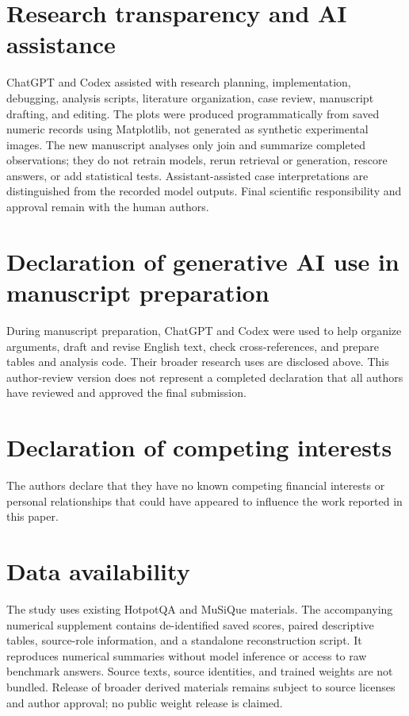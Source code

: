 \documentclass[preprint,12pt]{elsarticle}
\begin{document}
\section*{Research transparency and AI assistance}
ChatGPT and Codex assisted with research planning, implementation, debugging, analysis scripts, literature organization, case review, manuscript drafting, and editing. The plots were produced programmatically from saved numeric records using Matplotlib, not generated as synthetic experimental images. The new manuscript analyses only join and summarize completed observations; they do not retrain models, rerun retrieval or generation, rescore answers, or add statistical tests. Assistant-assisted case interpretations are distinguished from the recorded model outputs. Final scientific responsibility and approval remain with the human authors.

\section*{Declaration of generative AI use in manuscript preparation}
During manuscript preparation, ChatGPT and Codex were used to help organize arguments, draft and revise English text, check cross-references, and prepare tables and analysis code. Their broader research uses are disclosed above. This author-review version does not represent a completed declaration that all authors have reviewed and approved the final submission.

\section*{Declaration of competing interests}
The authors declare that they have no known competing financial interests or personal relationships that could have appeared to influence the work reported in this paper.

\section*{Data availability}
The study uses existing HotpotQA and MuSiQue materials. The accompanying numerical supplement contains de-identified saved scores, paired descriptive tables, source-role information, and a standalone reconstruction script. It reproduces numerical summaries without model inference or access to raw benchmark answers. Source texts, source identities, and trained weights are not bundled. Release of broader derived materials remains subject to source licenses and author approval; no public weight release is claimed.



\end{document}
